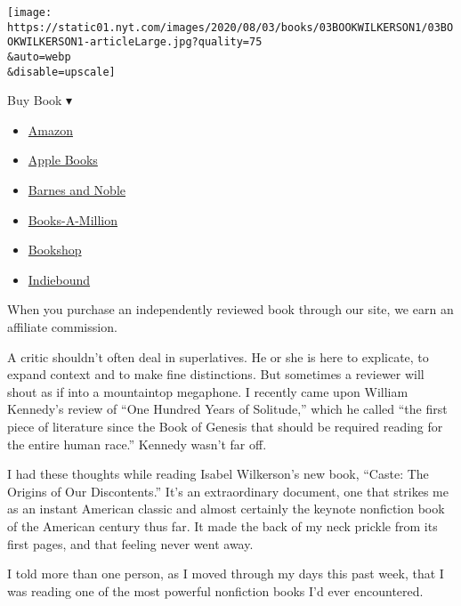 \texttt{[image: https://static01.nyt.com/images/2020/08/03/books/03BOOKWILKERSON1/03BOOKWILKERSON1-articleLarge.jpg?quality=75\\\&auto=webp\\\&disable=upscale]}

Buy Book ▾

\begin{itemize}
\tightlist
\item
  \href{https://www.amazon.com/gp/search?index=books\&tag=NYTBSREV-20\&field-keywords=Caste+Isabel+Wilkerson}{Amazon}
\item
  \href{https://du-gae-books-dot-nyt-du-prd.appspot.com/buy?title=Caste\&author=Isabel+Wilkerson}{Apple
  Books}
\item
  \href{https://www.anrdoezrs.net/click-7990613-11819508?url=https\%3A\%2F\%2Fwww.barnesandnoble.com\%2Fw\%2F\%3Fean\%3D9780593230251}{Barnes
  and Noble}
\item
  \href{https://www.anrdoezrs.net/click-7990613-35140?url=https\%3A\%2F\%2Fwww.booksamillion.com\%2Fp\%2FCaste\%2FIsabel\%2BWilkerson\%2F9780593230251}{Books-A-Million}
\item
  \href{https://bookshop.org/a/3546/9780593230251}{Bookshop}
\item
  \href{https://www.indiebound.org/book/9780593230251?aff=NYT}{Indiebound}
\end{itemize}

When you purchase an independently reviewed book through our site, we
earn an affiliate commission.

A critic shouldn't often deal in superlatives. He or she is here to
explicate, to expand context and to make fine distinctions. But
sometimes a reviewer will shout as if into a mountaintop megaphone. I
recently came upon William Kennedy's review of ``One Hundred Years of
Solitude,'' which he called ``the first piece of literature since the
Book of Genesis that should be required reading for the entire human
race.'' Kennedy wasn't far off.

I had these thoughts while reading Isabel Wilkerson's new book, ``Caste:
The Origins of Our Discontents.'' It's an extraordinary document, one
that strikes me as an instant American classic and almost certainly the
keynote nonfiction book of the American century thus far. It made the
back of my neck prickle from its first pages, and that feeling never
went away.

I told more than one person, as I moved through my days this past week,
that I was reading one of the most powerful nonfiction books I'd ever
encountered.

